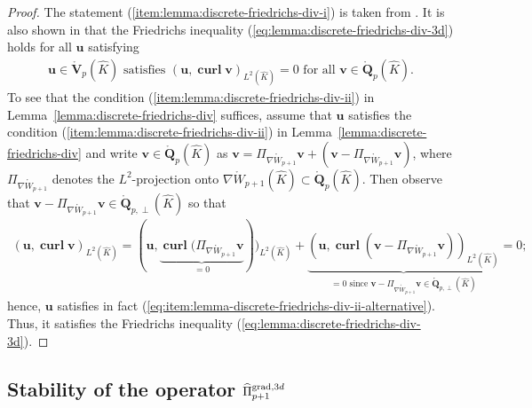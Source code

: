 \documentclass{article}
\newcommand{\hatPigradcom}{\widehat\Pi^{\operatorname*{grad},3d}_{p+1}}
\begin{document}
\begin{proof}
The statement (\ref{item:lemma:discrete-friedrichs-div-i}) is taken from \cite[Lemma~{5.2}]{demkowicz08}. 
It is also shown in \cite[Lemma~{5.2}]{demkowicz08} that the Friedrichs inequality 
(\ref{eq:lemma:discrete-friedrichs-div-3d}) holds for all ${\mathbf u}$ satisfying 
\begin{align}
\label{eq:item:lemma-discrete-friedrichs-div-ii-alternative}
{\mathbf{u}} \in
\mathring{\mathbf{V}}_p(\widehat{K}) 
\text{ satisfies } ({\mathbf{u}}, \operatorname*{\mathbf{curl}} \mathbf{v})_{L^{2}(\widehat{K})} = 0 
\text{ for all } \mathbf{v} \in \mathring{{\mathbf Q}}_{p}(\widehat K).
\end{align}
To see that the condition 
(\ref{item:lemma:discrete-friedrichs-div-ii}) in Lemma~\ref{lemma:discrete-friedrichs-div} 
suffices, assume that ${\mathbf u}$ satisfies the condition  
(\ref{item:lemma:discrete-friedrichs-div-ii}) in Lemma~\ref{lemma:discrete-friedrichs-div} and 
write ${\mathbf v} \in \mathring{\mathbf Q}_p(\widehat{K})$ as 
 $\mathbf{v}=\Pi_{\nabla \mathring{W}_{p+1}}\mathbf{v} + (\mathbf{v}-\Pi_{\nabla \mathring{W}_{p+1}}\mathbf{v})$, where $\Pi_{\nabla \mathring{W}_{p+1}}$ denotes the $L^2$-projection onto $\nabla \mathring{W}_{p+1}(\widehat{K}) \subset \mathring{\mathbf{Q}}_p(\widehat{K})$. Then observe that ${\mathbf v} - \Pi_{\nabla \mathring{W}_{p+1}}\mathbf{v} \in 
\mathring{\mathbf{Q}}_{p,\perp}(\widehat K)$ so that 
\begin{align*}
(\mathbf{u},\operatorname*{\mathbf{curl}}\mathbf{v})_{L^2(\widehat{K})} = 
(\mathbf{u},\underbrace{\operatorname*{\mathbf{curl}}(\Pi_{\nabla \mathring{W}_{p+1}}\mathbf{v}}_
                       {=0}                          )
)_{L^2(\widehat{K})} 
+ \underbrace{ (\mathbf{u},\operatorname*{\mathbf{curl}}(\mathbf{v}-\Pi_{\nabla \mathring{W}_{p+1}}\mathbf{v})
               )_{L^2(\widehat{K})}
             }_{=0
   \text{ since ${\mathbf v} - \Pi_{\nabla \mathring{W}_{p+1}} \mathbf {v} \in \mathring{\mathbf Q}_{p,\perp}(\widehat{K})$}}  = 0; 
\end{align*}
hence, ${\mathbf u}$ satisfies in fact 
(\ref{eq:item:lemma-discrete-friedrichs-div-ii-alternative}). Thus,
it satisfies the Friedrichs inequality  (\ref{eq:lemma:discrete-friedrichs-div-3d}).  
\end{proof}

\subsection{Stability of the operator $\protect\hatPigradcom$}
\end{document}
